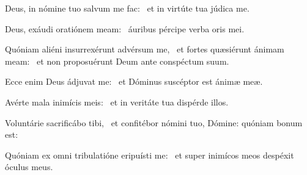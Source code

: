 \item Deus, in nómine tuo salvum me fac:~\psstar{} et in virtúte tua júdica me.

\item Deus, exáudi oratiónem meam:~\psstar{} áuribus pércipe verba oris mei.

\item Quóniam aliéni insurrexérunt advérsum me,~\pscross{} et fortes quæsiérunt ánimam meam:~\psstar{} et non proposuérunt Deum ante conspéctum suum.

\item Ecce enim Deus ádjuvat me:~\psstar{} et Dóminus suscéptor est ánimæ meæ.

\item Avérte mala inimícis meis:~\psstar{} et in veritáte tua dispérde illos.

\item Voluntárie sacrificábo tibi,~\psstar{} et confitébor nómini tuo, Dómine: quóniam bonum est:

\item Quóniam ex omni tribulatióne eripuísti me:~\psstar{} et super inimícos meos despéxit óculus meus.


